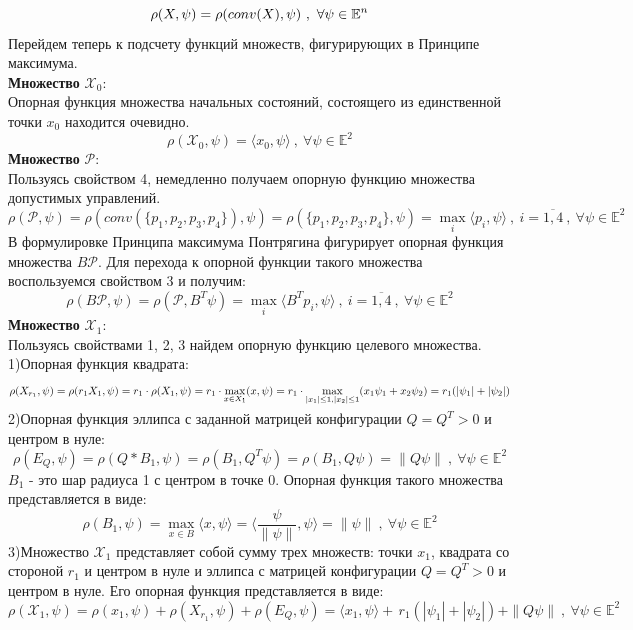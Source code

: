 \documentclass[10pt]{article}
\begin{document}
\[ \rho(X,\psi) = \rho(conv (X), \psi) \ , \ \forall \psi \in \mathbb{E}^n \bigskip \]
Перейдем теперь к подсчету функций множеств, фигурирующих в Принципе максимума.\medskip\\
\textbf{Множество} \( \mathcal{X}_0\):\smallskip\\
Опорная функция множества начальных состояний, состоящего из единственной точки \(x_0\) находится очевидно.
\[ \rho(\mathcal{X}_0, \psi) = \langle x_0, \psi \rangle \ , \ \forall \psi \in \mathbb{E}^2\] 
\textbf{Множество} \( \mathcal{P}\):\smallskip\\
Пользуясь свойством 4, немедленно получаем опорную функцию множества допустимых управлений.
\[ \rho(\mathcal{P}, \psi) = \rho(conv(\{p_1, p_2, p_3, p_4\}), \psi) = \rho(\{p_1, p_2, p_3, p_4\}, \psi) = \max\limits_{i} \langle p_i, \psi \rangle \ ,\ i = \overline{1, 4} \ , \ \forall \psi \in \mathbb{E}^2\] 
В формулировке Принципа максимума Понтрягина фигурирует опорная функция множества \(B \mathcal{P} \). Для перехода к опорной функции такого множества воспользуемся свойством 3 и получим:
\[ \rho(B \mathcal{P}, \psi) = \rho(\mathcal{P}, B^T \psi) = \max\limits_{i} \langle B^T p_i, \psi \rangle \ , \ i = \overline{1,4} \ , \ \forall \psi \in \mathbb{E}^2\]
\textbf{Множество} \( \mathcal{X}_1\):\smallskip\\
Пользуясь свойствами 1, 2, 3 найдем опорную функцию целевого множества.\medskip\\
1)Опорная функция квадрата: 
\[ \rho (X_{r_1},\psi) = \rho(r_1 X_1, \psi) = r_1 \cdot \rho(X_1, \psi) = r_1 \cdot  \smash{\displaystyle\max_{x \in X_1}} ( x, \psi) = r_1 \cdot \smash{\displaystyle\max_{|x_1| \leq 1, |x_2| \leq 1}}(x_1 \psi_1 + x_2 \psi_2) =  r_1(|\psi_1| + |\psi_2|) \bigskip\]
2)Опорная функция эллипса с заданной матрицей конфигурации \(Q = Q^T > 0\) и центром в нуле:
\[ \rho(E_Q, \psi) = \rho(Q * B_1, \psi) = \rho(B_1, Q^T \psi) = \rho(B_1, Q\psi) = \|Q\psi\| \ , \ \forall \psi \in \mathbb{E}^2 \]
\newpage
{} \( B_1 \) - это шар радиуса 1 с центром в точке 0. Опорная функция такого множества представляется в виде:
\[ \rho(B_1, \psi) = \max\limits_{x \in B} \langle x, \psi \rangle  =  \langle \frac{\psi}{ \| \psi \| }, \psi \rangle  = \| \psi \| \ , \ \forall \psi \in \mathbb{E}^2\]
3)Множество \( \mathcal{X}_1\) представляет собой сумму трех множеств: точки \( x_1\), квадрата со стороной \(r_1\) и центром в нуле и эллипса с матрицей конфигурации \( Q = Q^T > 0\) и центром в нуле. Его опорная функция представляется в виде:
\[ \rho(\mathcal{X}_1, \psi) = \rho(x_1, \psi) + \rho(X_{r_1}, \psi) + \rho(E_Q, \psi) =  \langle x_1, \psi \rangle + \, r_1 (|\psi_1| + |\psi_2|) + \|Q\psi\| \ , \ \forall \psi \in \mathbb{E}^2\]
\end{document}
